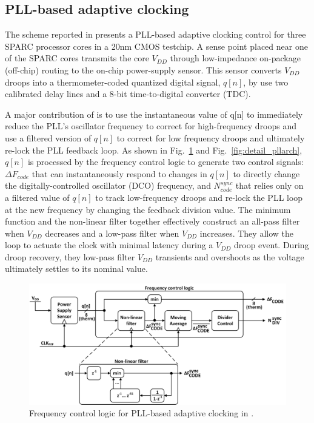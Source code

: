 \documentclass[twoside,9pt,journal,letterpage]{IEEEtran}
\begin{document}
\subsection{PLL-based adaptive clocking}
\label{sec:details_pll}
The scheme reported in \cite{hashimoto2018} presents a PLL-based adaptive clocking control for three SPARC processor cores in a 20nm CMOS testchip. A sense point placed near one of the SPARC cores transmits the core $V_{DD}$ through low-impedance on-package (off-chip) routing to the on-chip power-supply sensor. This sensor converts $V_{DD}$ droops into a thermometer-coded quantized digital signal, $q[n]$, by use two calibrated delay lines and a 8-bit time-to-digital converter (TDC). 

A major contribution of \cite{hashimoto2018} is to use the instantaneous value of q[n] to immediately reduce the PLL's oscillator frequency to correct for high-frequency droops and use a filtered version of $q[n]$ to correct for low frequency droops and ultimately re-lock the PLL feedback loop. As shown in Fig.\ \ref{fig:detail_pll} and Fig.\ \ref{fig:detail_pllarch}, $q[n]$ is processed by the frequency control logic to generate two control signals: $\Delta F_{code}$ that can instantaneously respond to changes in $q[n]$ to directly change the digitally-controlled oscillator (DCO) frequency, and $N^{sync}_{code}$ that relies only on a filtered value of $q[n]$ to track low-frequency droops and re-lock the PLL loop at the new frequency by changing the feedback division value. The minimum function and the non-linear filter together effectively construct an all-pass filter when $V_{DD}$ decreases and a low-pass filter when $V_{DD}$ increases. They allow the loop to actuate the clock with minimal latency during a $V_{DD}$ droop event. During droop recovery, they low-pass filter $V_{DD}$ transients and overshoots as the voltage ultimately settles to its nominal value.

\begin{figure}[h]
	\centering
	\includegraphics[width=\columnwidth]{fig_detail_pll}
	\caption{Frequency control logic for PLL-based adaptive clocking in \cite{hashimoto2018}.}
	\label{fig:detail_pll}
\end{figure}
\end{document}
